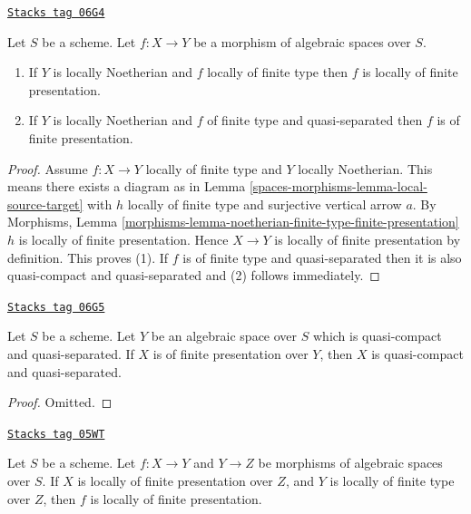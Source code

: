 \begin{lemma}
\label{spaces-morphisms-lemma-noetherian-finite-type-finite-presentation}
\href{https://stacks.math.columbia.edu/tag/06G4}{\texttt{Stacks tag 06G4}}

Let $S$ be a scheme.
Let $f : X \to Y$ be a morphism of algebraic spaces over $S$.
\begin{enumerate}
\item If $Y$ is locally Noetherian and $f$ locally of finite type
then $f$ is locally of finite presentation.
\item If $Y$ is locally Noetherian and $f$ of finite type and quasi-separated
then $f$ is of finite presentation.
\end{enumerate}
\end{lemma}

\begin{proof}
Assume $f : X \to Y$ locally of finite type and $Y$ locally Noetherian.
This means there exists a diagram as in
Lemma \ref{spaces-morphisms-lemma-local-source-target}
with $h$ locally of finite type and surjective vertical arrow $a$. By
Morphisms, Lemma
\ref{morphisms-lemma-noetherian-finite-type-finite-presentation}
$h$ is locally of finite presentation.
Hence $X \to Y$ is locally of finite presentation by definition.
This proves (1).
If $f$ is of finite type and quasi-separated then it is also
quasi-compact and quasi-separated and (2) follows immediately.
\end{proof}

\begin{lemma}
\label{spaces-morphisms-lemma-finite-presentation-quasi-compact-quasi-separated}
\href{https://stacks.math.columbia.edu/tag/06G5}{\texttt{Stacks tag 06G5}}

Let $S$ be a scheme. Let $Y$ be an algebraic space over $S$ which is
quasi-compact and quasi-separated. If $X$ is of finite presentation over
$Y$, then $X$ is quasi-compact and quasi-separated.
\end{lemma}

\begin{proof}
Omitted.
\end{proof}

\begin{lemma}
\label{spaces-morphisms-lemma-finite-presentation-permanence}
\href{https://stacks.math.columbia.edu/tag/05WT}{\texttt{Stacks tag 05WT}}

Let $S$ be a scheme.
Let $f : X \to Y$ and $Y \to Z$ be morphisms of algebraic spaces over $S$.
If $X$ is locally of finite presentation over $Z$, and
$Y$ is locally of finite type over $Z$, then $f$ is locally
of finite presentation.
\end{lemma}

